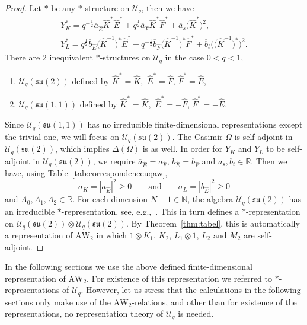 \documentclass[10pt,a4paper]{amsart}
\numberwithin{equation}{section}
\newcommand{\RR}{\mathbb{R}}
\newcommand{\NN}{\mathbb{N}}
\newcommand{\AW}[1]{\mathrm{AW}_{#1}}
\newcommand{\half}{\frac{1}{2}}
\newcommand{\uq}{\mathcal{U}_q(\mathfrak{su}(2))}
\newcommand{\Uq}{\mathcal{U}_q}
\newcommand{\uqeen}{\mathcal{U}_q(\mathfrak{su}(1,\!1))}
\begin{document}
\begin{proof}
	Let $*$ be any $*$-structure on $\Uq$, then we have
	\begin{gather*}
		Y_K^*=q^{-\half} \overline{a}_{\hat{E}} \hat{K}^*\hat{E}^*+ q^{\half}\overline{a}_{\hat{F}} \hat{K}^*\hat{F}^* + \overline{a}_s \big(\hat{K}^*\big)^2,\\
		Y_{L}^* =q^{\half} \overline{b}_{\hat{E}} \big(\hat{K}^{-1}\big)^*\hat{E}^*+ q^{-\half} \overline{b}_{\hat{F}} \big(\hat{K}^{-1}\big)^*\hat{F}^* + \overline{b}_t \big(\big(\hat{K}^{-1}\big)^*\big)^2.
	\end{gather*}
	There are 2 inequivalent $*$-structures on $\Uq$ in the case $0<q<1$,
	\begin{enumerate}\itemsep=0pt
		\item[(i)] $\uq$ defined by $\hat{K}^*=\hat{K},$ $\hat{E}^*=\hat{F}$, $\hat{F}^*=\hat{E}$,
		\item[(ii)] $\uqeen$ defined by $\hat{K}^*=\hat{K},$ $\hat{E}^*=-\hat{F}$, $\hat{F}^*=-\hat{E}$.
	\end{enumerate}
	Since $\uqeen$ has no irreducible finite-dimensional representations except the trivial one, we will focus on $\uq$. The Casimir $\Omega$ is self-adjoint in $\uq$, which implies $\Delta(\Omega)$ is as well. In order for $Y_K$ and $Y_L$ to be self-adjoint in $\uq$, we require 	$\overline{a}_{\hat{E}} = a_{\hat{F}}$, $\overline{b}_{\hat{E}}=b_{\hat{F}}$ and $a_s,b_t\in\RR$. Then we have, using Table~\ref{tab:correspondenceuqaw},
	\[
	\sigma_K=|a_{\hat{E}}|^2 \geq 0\qquad \text{and}\qquad \sigma_L=|b_{\hat{E}}|^2 \geq 0
	\]
	and $A_0,A_1,A_2\in\RR$. For each dimension $N+1\in\NN$, the algebra $\uq$ has an irreducible $*$-representation, see, e.g.,~\cite{Koelink1996}. This in turn defines a $*$-representation on $\uq\otimes \uq$. By Theorem~\ref{thm:tabel}, this is automatically a representation of $\AW{2}$ in which $1\otimes K_1$, $K_2$, $L_1\otimes 1$, $L_2$ and $M_2$ are self-adjoint.	
\end{proof}

\begin{Remark}In the following sections we use the above defined finite-dimensional representation of $\AW{2}$. For existence of this representation we referred to $*$-representations of $\Uq$. However, let us stress that the calculations in the following sections only make use of the $\AW{2}$-relations, and other than for existence of the representations, no representation theory of $\Uq$ is needed.
\end{Remark}
\end{document}
